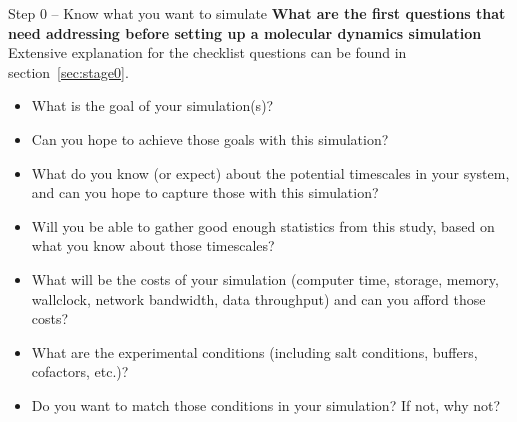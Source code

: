 \documentclass[9pt,bestpractices]{livecoms}
\begin{document}
\begin{Checklists*}[p!]

\begin{checklist}{Step 0 -- Know what you want to simulate }
\textbf{What are the first questions that need addressing before setting up a molecular dynamics simulation}\\
Extensive explanation for the checklist questions can be found in section~\ref{sec:stage0}.
\begin{itemize}
\item What is the goal of your simulation(s)? 
\item Can you hope to achieve those goals with this simulation?
\item What do you know (or expect) about the potential timescales in your system, and can you hope to capture those with this simulation?
\item Will you be able to gather good enough statistics from this study, based on what you know about those timescales?
\item What will be the costs of your simulation (computer time, storage, memory, wallclock, network bandwidth, data throughput) and can you afford those costs? 
\item What are the experimental conditions (including salt conditions, buffers, cofactors, etc.)? 
\item Do you want to match those conditions in your simulation? If not, why not?
\end{itemize}
\end{checklist}


\end{Checklists*}
\end{document}
